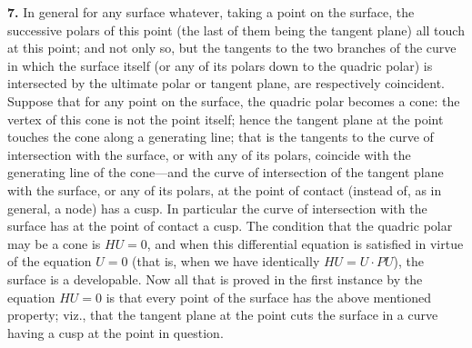 \documentclass[11pt,a4paper]{article}
\begin{document}
\textbf{7.} In general for any surface whatever, taking a point on the surface, the successive polars of this point (the last of them being the tangent plane) all touch at this point; and not only so, but the tangents to the two branches of the curve in which the surface itself (or any of its polars down to the quadric polar) is intersected by the ultimate polar or tangent plane, are respectively coincident. Suppose that for any point on the surface, the quadric polar becomes a cone: the vertex of this cone is not the point itself; hence the tangent plane at the point touches the cone along a generating line; that is the tangents to the curve of intersection with the surface, or with any of its polars, coincide with the generating line of the cone---and the curve of intersection of the tangent plane with the surface, or any of its polars, at the point of contact (instead of, as in general, a node) has a cusp. In particular the curve of intersection with the surface has at the point of contact a cusp. The condition that the quadric polar may be a cone is $HU = 0$, and when this differential equation is satisfied in virtue of the equation $U = 0$ (that is, when we have identically $HU = U\cdot PU$), the surface is a developable. Now all that is proved in the first instance by the equation $HU = 0$ is that every point of the surface has the above mentioned property; viz., that the tangent plane at the point cuts the surface in a curve having a cusp at the point in question.

\medskip
\end{document}
